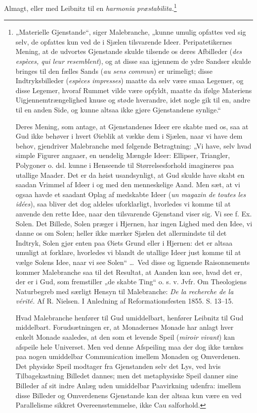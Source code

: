 \documentclass[12pt]{book}
\begin{document}
Almagt, eller med Leibnitz til en \textit{harmonia præstabilita.}\footnote{%
„Materielle Gjenstande“, siger Malebranche, „kunne umulig opfattes
ved sig selv, de opfattes kun ved de i Sjælen tilsvarende Ideer.
Peripatetikernes Mening, at de udvortes Gjenstande skulde tilsende
os deres Afbilleder (\textit{des espèces, qui leur resemblent}), og at disse
saa igjennem de ydre Sandser skulde bringes til den fælles Sands
(\textit{au sens commun}) er urimeligt; disse Indtryksbilleder (\textit{espèces
impresses}) maatte da selv være smaa Legemer, og disse Legemer,
hvoraf Rummet vilde være opfyldt, maatte da ifølge Materiens
Uigjennemtrængelighed knuse og støde hverandre, idet nogle gik til
en, andre til en anden Side, og kunne altsaa ikke gjøre Gjenstandene
synlige.“\par
Deres Mening, som antage, at Gjenstandenes Ideer ere skabte
med os, saa at Gud ikke behøver i hvert Øieblik at vække dem i
Sjælen, naar vi have dem behov, gjendriver Malebranche med
følgende Betragtning: „Vi have, selv hvad simple Figurer angaaer,
en uendelig Mængde Ideer: Ellipser, Triangler, Polygoner o. dsl.
kunne i Henseende til Størrelsesforhold imagineres paa utallige
Maader. Det er da høist usandsynligt, at Gud skulde have skabt
en saadan Vrimmel af Ideer i og med den menneskelige Aand.
Men sæt, at vi ogsaa havde et saadant Oplag af medskabte Ideer
(\textit{un magazin de toutes les idées}), saa bliver det dog aldeles uforklarligt,
hvorledes vi komme til at anvende den rette Idee, naar
den tilsvarende Gjenstand viser sig. Vi see f. Ex. Solen. Det
Billede, Solen præger i Hjernen, har ingen Lighed med den Idee,
vi danne os om Solen; heller ikke mærker Sjælen det allermindste
til det Indtryk, Solen gjør enten paa Øiets Grund eller i Hjernen:
det er altsaa umuligt at forklare, hvorledes vi blandt de utallige
Ideer just komme til at vælge Solens Idee, naar vi see Solen“ \dots\
Ved disse og lignende Raisonnements kommer Malebranche saa til
det Resultat, at Aanden kan see, hvad det er, der er i Gud, som
fremstiller „de skabte Ting“ o. s. v. Jvfr. Om Theologiens Naturbegreb
med særligt Hensyn til Malebranche: \textit{De la recherche de
la vérité.} Af R. Nielsen. I Anledning af Reformationsfesten
1855. S. 13--15.\par
Hvad Malebranche henfører til Gud umiddelbart, henfører
Leibnitz til Gud middelbart. Forudsætningen er, at Monadernes
Monade har anlagt hver enkelt Monade saaledes, at den som et
levende Speil (\textit{miroir vivant}) kan afspeile hele Universet. Men
ved denne Afspeiling maa der dog ikke tænkes paa nogen umiddelbar
Communication imellem Monaden og Omverdenen. Det physiske
Speil modtager fra Gjenstanden selv det Lys, ved hvis Tilbagekastning %
Billedet dannes; men det metaphysiske Speil danner sine
Billeder af sit indre Anlæg uden umiddelbar Paavirkning udenfra:
imellem disse Billeder og Omverdenens Gjenstande kan der altsaa
kun være en ved Parallelisme sikkret Overeensstemmelse, ikke Cau%
salforhold.}
\end{document}
